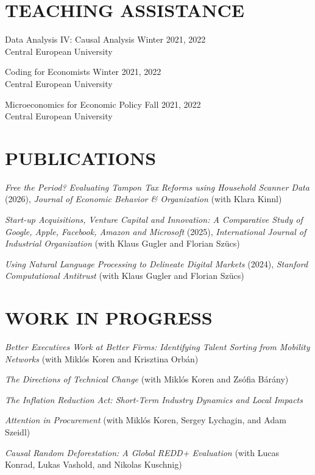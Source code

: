 \documentclass[margin]{res}
\begin{document}
\begin{resume}
\section{TEACHING ASSISTANCE}
Data Analysis IV: Causal Analysis \hfill Winter 2021, 2022 \\
Central European University
\par
Coding for Economists \hfill Winter 2021, 2022 \\
Central European University
\par
Microeconomics for Economic Policy \hfill Fall 2021, 2022 \\
Central European University

\section{PUBLICATIONS}
\textit{Free the Period? Evaluating Tampon Tax Reforms using Household Scanner Data} (2026), \textit{Journal of Economic Behavior \& Organization} (with Klara Kinnl)
\par
\textit{Start-up Acquisitions, Venture Capital and Innovation: A Comparative Study of Google, Apple, Facebook, Amazon and Microsoft} (2025), \textit{International Journal of Industrial Organization} (with Klaus Gugler and Florian Szücs)
\par
\textit{Using Natural Language Processing to Delineate Digital Markets} (2024), \textit{Stanford Computational Antitrust} (with Klaus Gugler and Florian Szücs)
\par

\section{WORK IN PROGRESS}
\textit{Better Executives Work at Better Firms: Identifying Talent Sorting from Mobility Networks} (with Miklós Koren and Krisztina Orbán)
\par
\textit{The Directions of Technical Change} (with Miklós Koren and Zsófia Bárány)
\par
\textit{The Inflation Reduction Act: Short-Term Industry Dynamics and Local Impacts}
\par
\textit{Attention in Procurement} (with Miklós Koren, Sergey Lychagin, and Adam Szeidl)
\par
\textit{Causal Random Deforestation: A Global REDD+ Evaluation} (with Lucas Konrad, Lukas Vashold, and Nikolas Kuschnig)
\par



\end{resume}
\end{document}
